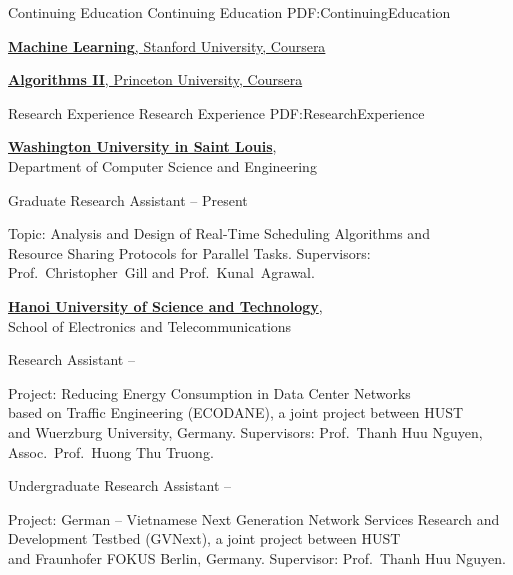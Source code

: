 \documentclass[letterpaper,MMMyyyy,nonstopmode]{simpleresumecv}
\begin{document}
\begin{Body}
\Section
{Continuing Education}
{Continuing Education}
{PDF:ContinuingEducation}

\Entry
\href{https://www.coursera.org/account/accomplishments/certificate/HZCT9RFV84YS}
{\textbf{Machine Learning}, Stanford University, Coursera}
\hfill {}

\BigGap
\Entry
\href{https://www.coursera.org/learn/algorithms-part2}
{\textbf{Algorithms II}, Princeton University, Coursera}
\hfill {}


\Section
{Research Experience}
{Research Experience}
{PDF:ResearchExperience}

\Entry
\href{https://cse.wustl.edu/Pages/default.aspx}
{\textbf{Washington University in Saint Louis}}, \\
Department of Computer Science and Engineering

\Gap
\BulletItem
Graduate Research Assistant
\hfill
{} -- Present
\begin{Detail}
\SubBulletItem
Topic: Analysis and Design of Real-Time Scheduling Algorithms and \\
Resource Sharing Protocols for Parallel Tasks. 
\SubBulletItem
Supervisors:
Prof.~Christopher~Gill and Prof.~Kunal~Agrawal.
\end{Detail}

\BigGap
\Entry
\href{https://en.hust.edu.vn/home}
{\textbf{Hanoi University of Science and Technology}}, \\
School of Electronics and Telecommunications

\Gap
\BulletItem Research Assistant
\hfill
{} -- 
\begin{Detail}
\SubBulletItem
Project: Reducing Energy Consumption in Data Center Networks \\
based on Traffic Engineering (ECODANE), a joint project between HUST \\
and Wuerzburg University, Germany. 
\SubBulletItem
Supervisors: Prof.~Thanh Huu Nguyen, Assoc.~Prof.~Huong Thu Truong.
\end{Detail}

\Gap
\BulletItem Undergraduate Research Assistant
\hfill
{} -- 
\begin{Detail}
\SubBulletItem
Project: German – Vietnamese Next Generation Network Services Research and \\
Development Testbed (GVNext), a joint project between HUST \\
and Fraunhofer FOKUS Berlin, Germany.
\SubBulletItem
Supervisor: Prof.~Thanh Huu Nguyen.
\end{Detail}


\end{Body}
\end{document}
